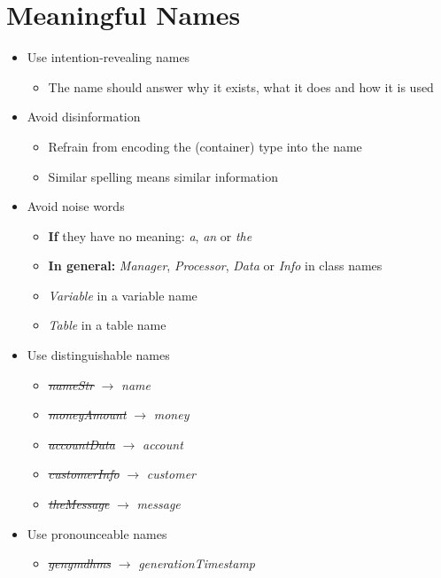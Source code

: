 
\section*{Meaningful Names}
\begin{itemize}
    \item Use intention-revealing names
    \begin{itemize}
        \item The name should answer why it exists, what it does and how it is used
    \end{itemize}
    \item Avoid disinformation
    \begin{itemize}
        \item Refrain from encoding the (container) type into the name
        \item Similar spelling means similar information
    \end{itemize}
    \item Avoid noise words
    \begin{itemize}
        \item \textbf{If} they have no meaning: \textit{a}, \textit{an} or \textit{the}
        \item \textbf{In general:} \textit{Manager}, \textit{Processor}, \textit{Data} or \textit{Info} in class names
        \item \textit{Variable} in a variable name
        \item \textit{Table} in a table name
    \end{itemize}
    \item Use distinguishable names
    \begin{itemize}
        \item \st{\textit{nameStr}} $\rightarrow$ \textit{name}
        \item \st{\textit{moneyAmount}} $\rightarrow$ \textit{money}
        \item \st{\textit{accountData}} $\rightarrow$ \textit{account}
        \item \st{\textit{customerInfo}} $\rightarrow$ \textit{customer}
        \item \st{\textit{theMessage}} $\rightarrow$ \textit{message}
    \end{itemize}
    \item Use pronounceable names
    \begin{itemize}
        \item \st{\textit{genymdhms}} $\rightarrow$ \textit{generationTimestamp}

\end{itemize}
\end{itemize}
